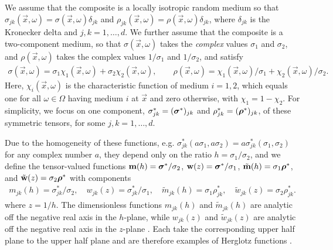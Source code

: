 \documentclass{cmslatex}
\newcommand\bsig{\mbox{\boldmath${\sigma}$}}
\newcommand\brho{\mbox{\boldmath${\rho}$}}
\begin{document}
We assume that the composite is a locally isotropic random medium so
that $\sigma_{jk}(\vec{x},\omega)=\sigma(\vec{x},\omega)\delta_{jk}$ and
$\rho_{jk}(\vec{x},\omega)=\rho(\vec{x},\omega)\delta_{jk}$, where $\delta_{jk}$ is the
Kronecker delta and $j,k=1,\ldots,d$. We further assume that the composite
is a two-component medium, so that $\sigma(\vec{x},\omega)$ takes the
\emph{complex} values $\sigma_1$ and $\sigma_2$, and $\rho(\vec{x},\omega)$ takes the
complex values $1/\sigma_1$ and $1/\sigma_2$, and satisfy \cite{Golden:CMP-473}
% 
\begin{align}\label{eq:two-phase_eps}
  \sigma(\vec{x},\omega)=\sigma_1\chi_1(\vec{x},\omega)+\sigma_2\chi_2(\vec{x},\omega), \qquad
  \rho(\vec{x},\omega)=\chi_1(\vec{x},\omega)/\sigma_1+\chi_2(\vec{x},\omega)/\sigma_2.
\end{align}
%
Here, $\chi_i(\vec{x},\omega)$ is the characteristic function of medium
$i=1,2$, which equals one for all $\omega\in\Omega$ having medium $i$ at $\vec{x}$
and zero otherwise, with $\chi_1=1-\chi_2$. For simplicity, we focus on one
component, $\sigma^*_{jk}=(\bsig^*)_{jk}$ and $\rho^*_{jk}=(\brho^*)_{jk}$, of
these symmetric tensors, for some $j,k=1,\ldots,d$.  



Due to the homogeneity of these functions,
e.g. $\sigma_{jk}^*(a\sigma_1,a\sigma_2)=a\sigma_{jk}^*(\sigma_1,\sigma_2)$ for any complex number
$a$, they depend only on the ratio $h=\sigma_1/\sigma_2$, and we define the
tensor-valued functions $\mathbf{m}(h)=\bsig^*/\sigma_2$,
$\mathbf{w}(z)=\bsig^*/\sigma_1$, $\tilde{\mathbf{m}}(h)=\sigma_1\brho^*$, and
$\tilde{\mathbf{w}}(z)=\sigma_2\brho^*$ with components  
%
\begin{align}\label{eq:m_h}
  m_{jk}(h)=\sigma_{jk}^*/\sigma_2, \quad
  w_{jk}(z)=\sigma_{jk}^*/\sigma_1, \quad
   \tilde{m}_{jk}(h)=\sigma_1\rho_{jk}^*, \quad
   \tilde{w}_{jk}(z)=\sigma_2\rho_{jk}^*.
\end{align}
%
where $z=1/h$. The dimensionless functions $m_{jk}(h)$ and
$\tilde{m}_{jk}(h)$ are analytic off the negative real axis in the
$h$-plane, while $w_{jk}(z)$ and $\tilde{w}_{jk}(z)$ are analytic off
the negative real axis in the $z$-plane \cite{Golden:CMP-473}. Each
take the corresponding upper half plane to the upper half plane and
are therefore examples of Herglotz functions
\cite{Deift:2000:RMT,Golden:CMP-473}.
\end{document}
